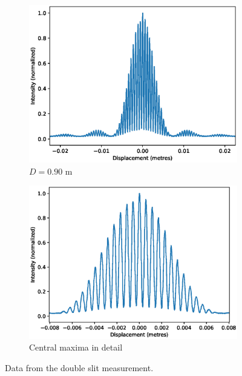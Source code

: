 \documentclass[11pt]{article}
\begin{document}
        \begin{figure}[H]
        \centering
        \begin{subfigure}[b]{0.49\textwidth}
                \includegraphics[width=\textwidth]{Slit4.eps}
                \caption{$D = 0.90$ m}
        \end{subfigure}
        \begin{subfigure}[b]{0.49\textwidth}
                \includegraphics[width=\textwidth]{Slit4_detail.eps}
                \caption{Central maxima in detail}
        \end{subfigure}
        \caption{Data from the double slit measurement.}
        \label{fig:double}
        \end{figure}
        
\end{document}
